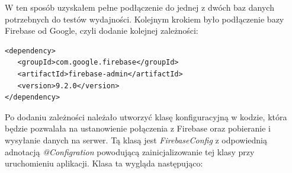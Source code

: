 W ten sposób uzyskałem pełne podłączenie do jednej z dwóch baz danych potrzebnych do testów wydajności. Kolejnym krokiem było podłączenie bazy Firebase od Google, czyli dodanie kolejnej zależności:

\begin{lstlisting}
<dependency>
   <groupId>com.google.firebase</groupId>
   <artifactId>firebase-admin</artifactId>
   <version>9.2.0</version>
</dependency>
\end{lstlisting}

Po dodaniu zależności należało utworzyć klasę konfiguracyjną w kodzie, która będzie pozwalała na ustanowienie połączenia z Firebase oraz pobieranie i wysyłanie danych na serwer.
Tą klasą jest \textit{FirebaseConfig} z odpowiednią adnotacją \textit{@Configration} powodującą zainicjalizowanie tej klasy przy uruchomieniu aplikacji.
Klasa ta wygląda następująco:
